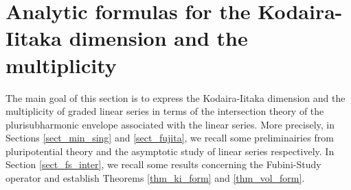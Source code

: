 \documentclass[12pt]{article}
\numberwithin{equation}{section}
\theoremstyle{theorem}
\theoremstyle{definition}
\theoremstyle{remark}
\begin{document}
	
	\section{Analytic formulas for the Kodaira-Iitaka dimension and the multiplicity}\label{sect_2}
		
	The main goal of this section is to express the Kodaira-Iitaka dimension and the multiplicity of graded linear series in terms of the intersection theory of the plurisubharmonic envelope associated with the linear series.
	More precisely, in Sections \ref{sect_min_sing} and \ref{sect_fujita}, we recall some preliminairies from pluripotential theory and the asymptotic study of linear series respectively.
	In Section \ref{sect_fs_inter}, we recall some results concerning the Fubini-Study operator and establish Theorems \ref{thm_ki_form} and \ref{thm_vol_form}.
	
	
\end{document}
